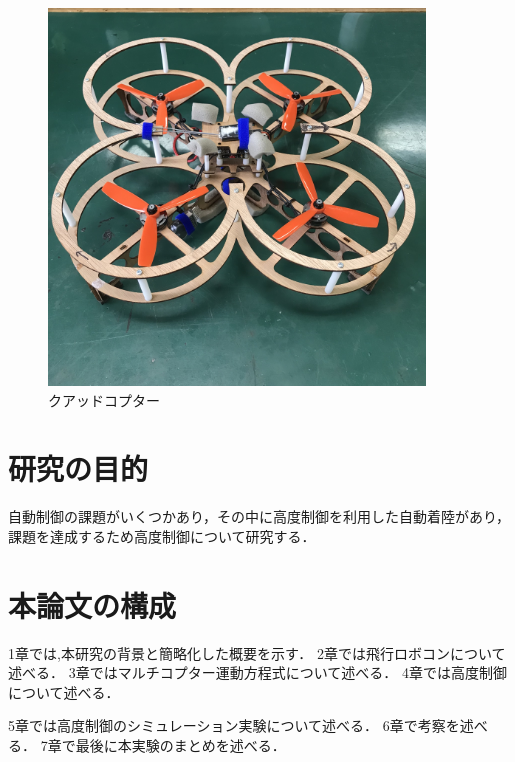 \begin{figure}[htbp]
  \begin{center}
    \includegraphics[width=100mm]{img/drone.jpeg}
    \end{center}
  \caption{クアッドコプター}
 \label{fig:robot}
\end{figure}

\section{研究の目的}

自動制御の課題がいくつかあり，その中に高度制御を利用した自動着陸があり，課題を達成するため高度制御について研究する．

\section{本論文の構成}
1章では,本研究の背景と簡略化した概要を示す．
2章では飛行ロボコンについて述べる．
3章ではマルチコプター運動方程式について述べる．
4章では高度制御について述べる．

5章では高度制御のシミュレーション実験について述べる．
6章で考察を述べる．
7章で最後に本実験のまとめを述べる．